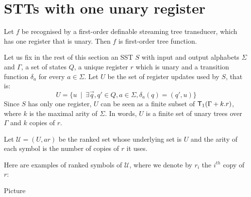 \section{STTs with one unary register}
\label{sec:one-register}



\begin{lemma}\label{lem:one-register}
    Let $f$ be recognised by a first-order definable streaming tree transducer, which has one register that is unary. Then $f$ is first-order tree function.
\end{lemma}

Let us fix in the rest of this section an SST $S$ with input and output alphabets $\Sigma$ and $\Gamma$, a set of states $Q$, a unique register $r$ which is unary and a transition function $\delta_a$ for every $a\in \Sigma$. Let $U$ be the set of register updates used by $S$, that is:
$$U=\{u\ \mid\  \exists \vec{q}, q' \in Q, a\in \Sigma, \delta_a(q)=(q',u)\}$$
Since $S$ has only one register,  $U$ can be seen as a finite subset of  $\mathsf T_1( \Gamma + k.r)$, where $k$ is the maximal arity of $\Sigma$.
In words, $U$ is a finite set of unary trees over $\Gamma$ and $k$ copies of $r$.

Let $\mathcal{U}=(U,ar)$ be the ranked set whose underlying set is $U$ and the arity of each symbol is the number of copies of $r$ it uses. 

Here are examples of ranked symbols of $\mathcal{U}$, where we denote by $r_i$ the $i^{th}$ copy of $r$:
\begin{center}
Picture
\end{center}

